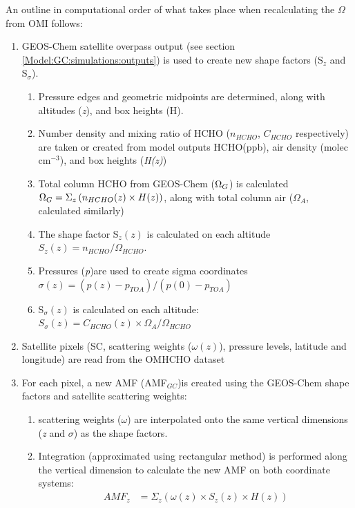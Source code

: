     An outline in computational order of what takes place when recalculating the $\Omega$ from OMI follows:
    \begin{enumerate}
      \item GEOS-Chem satellite overpass output (see section \ref{Model:GC:simulations:outputs}) is used to create new shape factors (S$_z$ and S$_\sigma$).
      \begin{enumerate}
        \item Pressure edges and geometric midpoints are determined, along with altitudes (\textit{z}), and box heights (H).
        \item Number density and mixing ratio of HCHO ($n_{HCHO}$, $C_{HCHO}$ respectively) are taken or created from model outputs HCHO(ppb), air density (molec cm$^{-3}$), and box heights (\textit{H(z)})
        \item Total column HCHO from GEOS-Chem ($\Omega_{G}$) is calculated $\Omega_{G} = \Sigma_z \left(n_{HCHO}(z) \times H(z) \right)$, along with total column air ($\Omega_{A}$, calculated similarly)
        \item The shape factor S$_z(z)$ is calculated on each altitude $S_z(z) = n_{HCHO} / \Omega_{HCHO}$.
        \item Pressures (\textit{p})are used to create sigma coordinates $\sigma(z) = (p(z) - p_{TOA}) / (p(0)-p_{TOA})$
        \item S$_\sigma(z)$ is calculated on each altitude: $S_\sigma(z) = C_{HCHO}(z) \times \Omega_A / \Omega_{HCHO}$
      \end{enumerate}
      \item Satellite pixels (SC, scattering weights ($\omega(z)$), pressure levels, latitude and longitude) are read from the OMHCHO dataset
      \item For each pixel, a new AMF (AMF$_{GC}$)is created using the GEOS-Chem shape factors and satellite scattering weights:
      \begin{enumerate}
        \item scattering weights ($\omega$) are interpolated onto the same vertical dimensions (\textit{z} and $\sigma$) as the shape factors.
        \item Integration (approximated using rectangular method) is performed along the vertical dimension to calculate the new AMF on both coordinate systems:
        \begin{align}
          AMF_z &= \Sigma_z \left(\omega(z) \times S_z(z) \times H(z)\right) \\

\end{align}
\end{enumerate}
\end{enumerate}
